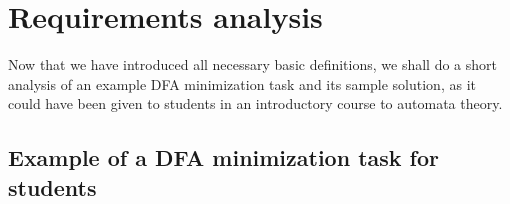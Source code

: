 %
%

\section{Requirements analysis}

Now that we have introduced all necessary basic definitions, we shall do a short analysis of an example DFA minimization task and its sample solution, as it could have been given to students in an introductory course to automata theory.

\subsection{Example of a DFA minimization task for students}


